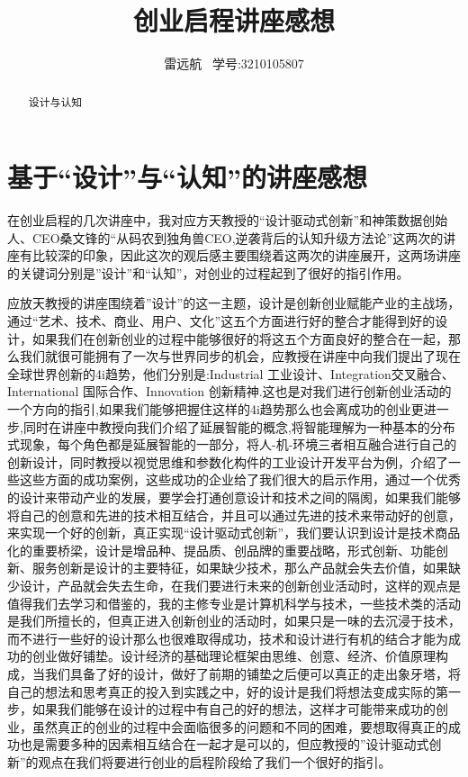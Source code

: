 \documentclass{article}
\title{创业启程讲座感想}
\author{雷远航  \  学号:3210105807}
\begin{document}
\maketitle

\begin{abstract}
设计与认知
\end{abstract}

\section*{基于“设计”与“认知”的讲座感想}
在创业启程的几次讲座中，我对应方天教授的“设计驱动式创新”和神策数据创始人、CEO桑文锋的“从码农到独角兽CEO,逆袭背后的认知升级方法论”这两次的讲座有比较深的印象，因此这次的观后感主要围绕着这两次的讲座展开，这两场讲座的关键词分别是”设计”和“认知”，对创业的过程起到了很好的指引作用。

应放天教授的讲座围绕着”设计”的这一主题，设计是创新创业赋能产业的主战场，通过“艺术、技术、商业、用户、文化”这五个方面进行好的整合才能得到好的设计，如果我们在创新创业的过程中能够很好的将这五个方面良好的整合在一起，那么我们就很可能拥有了一次与世界同步的机会，应教授在讲座中向我们提出了现在全球世界创新的4i趋势，他们分别是:Industrial 工业设计、Integration交叉融合、International 国际合作、Innovation 创新精神.这也是对我们进行创新创业活动的一个方向的指引,如果我们能够把握住这样的4i趋势那么也会离成功的创业更进一步,同时在讲座中教授向我们介绍了延展智能的概念,将智能理解为一种基本的分布式现象，每个角色都是延展智能的一部分，将人-机-环境三者相互融合进行自己的创新设计，同时教授以视觉思维和参数化构件的工业设计开发平台为例，介绍了一些这些方面的成功案例，这些成功的企业给了我们很大的启示作用，通过一个优秀的设计来带动产业的发展，要学会打通创意设计和技术之间的隔阂，如果我们能够将自己的创意和先进的技术相互结合，并且可以通过先进的技术来带动好的创意，来实现一个好的创新，真正实现“设计驱动式创新”，我们要认识到设计是技术商品化的重要桥梁，设计是增品种、提品质、创品牌的重要战略，形式创新、功能创新、服务创新是设计的主要特征，如果缺少技术，那么产品就会失去价值，如果缺少设计，产品就会失去生命，在我们要进行未来的创新创业活动时，这样的观点是值得我们去学习和借鉴的，我的主修专业是计算机科学与技术，一些技术类的活动是我们所擅长的，但真正进入创新创业的活动时，如果只是一味的去沉浸于技术，而不进行一些好的设计那么也很难取得成功，技术和设计进行有机的结合才能为成功的创业做好铺垫。设计经济的基础理论框架由思维、创意、经济、价值原理构成，当我们具备了好的设计，做好了前期的铺垫之后便可以真正的走出象牙塔，将自己的想法和思考真正的投入到实践之中，好的设计是我们将想法变成实际的第一步，如果我们能够在设计的过程中有自己的好的想法，这样才可能带来成功的创业，虽然真正的创业的过程中会面临很多的问题和不同的困难，要想取得真正的成功也是需要多种的因素相互结合在一起才是可以的，但应教授的”设计驱动式创新”的观点在我们将要进行创业的启程阶段给了我们一个很好的指引。
\end{document}
